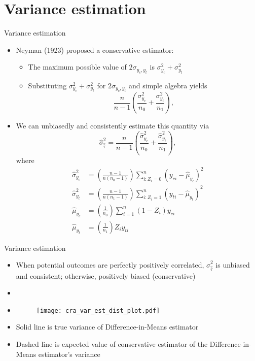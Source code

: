 \documentclass[table, xcolor={dvipsnames}, 9pt]{beamer}
\theoremstyle{newstyle}
\begin{document}
\section{Variance estimation}
\begin{frame}{Variance estimation} 
\begin{itemize}
\item Neyman (1923) proposed a conservative estimator: \pause 
\begin{itemize}
\item The maximum possible value of $2\sigma_{y_c, y_t}$ is $\sigma^2_{y_c} + \sigma^2_{y_t}$ \pause 
\item Substituting $\sigma^2_{y_c} + \sigma^2_{y_t}$ for $2\sigma_{y_c, y_t}$ and simple algebra yields \pause 
\begin{equation}
\frac{n}{n - 1}\left(\frac{\sigma^2_{y_c}}{n_0} + \frac{\sigma^2_{y_t}}{n_1}\right),
\end{equation} \pause 
\end{itemize}	
\item We can unbiasedly and consistently estimate this quantity via
\begin{equation}
\hat{\sigma}^2_{\hat{\bar{\tau}}} = \frac{n}{n - 1}\left(\frac{\hat{\sigma}^2_{y_c}}{n_0} + \frac{\hat{\sigma}^2_{y_t}}{n_1} \right),
\end{equation}
where \pause 
\begin{align*}
\hat{\sigma}^2_{y_c} & = \left(\frac{n - 1}{n\left(n_0 - 1\right)}\right)\sum \limits_{i: Z_i = 0}^n \left(y_{ci} - \hat{\mu}_{y_c}\right)^2 \\
\hat{\sigma}^2_{y_t} & = \left(\frac{n - 1}{n\left(n_1 - 1\right)}\right)\sum \limits_{i: Z_i = 1}^{n} \left(y_{ti} - \hat{\mu}_{y_t}\right)^2 \\ 
\hat{\mu}_{y_c} & = \left(\frac{1}{n_0}\right) \sum \limits_{i = 1}^n \left(1 - Z_i\right)y_{ci} \\ 
\hat{\mu}_{y_t} & = \left(\frac{1}{n_1}\right) Z_i y_{ti}
\end{align*}
\end{itemize}
\end{frame}
\begin{frame}{Variance estimation} 
\begin{itemize}
\item When potential outcomes are perfectly positively correlated, $\hat{\sigma}^2_{\hat{\bar{\tau}}}$ is unbiased and consistent; otherwise, positively biased (conservative) \pause 
\item[]
\item[]
\begin{figure}[H]
\texttt{[image: cra\_var\_est\_dist\_plot.pdf]}
\end{figure} \pause 
\item Solid line is true variance of Difference-in-Means estimator \pause 
\item Dashed line is expected value of conservative estimator of the Difference-in-Means estimator's variance
\end{itemize}
\end{frame}
\end{document}

